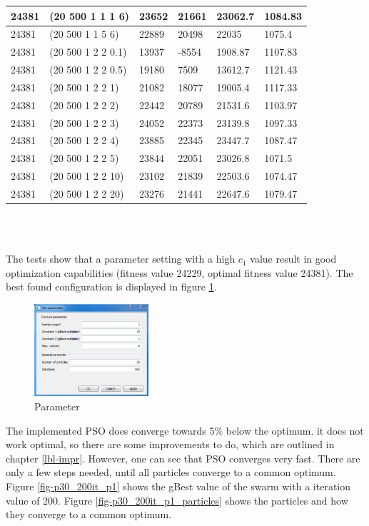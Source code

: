 \documentclass{article}
\begin{document}
\begin{tabular}{|l|l|l|l|l|l|}
	24381 & (20 500 1 1 1 6) & 23652 & 21661 & 23062.7 & 1084.83 \\ \hline
	24381 & (20 500 1 1 5 6) & 22889 & 20498 & 22035 & 1075.4 \\ \hline
	24381 & (20 500 1 2 2 0.1) & 13937 & -8554 & 1908.87 & 1107.83 \\ \hline
	24381 & (20 500 1 2 2 0.5) & 19180 & 7509 & 13612.7 & 1121.43 \\ \hline
	24381 & (20 500 1 2 2 1) & 21082 & 18077 & 19005.4 & 1117.33 \\ \hline
	24381 & (20 500 1 2 2 2) & 22442 & 20789 & 21531.6 & 1103.97 \\ \hline
	24381 & (20 500 1 2 2 3) & 24052 & 22373 & 23139.8 & 1097.33 \\ \hline
	24381 & (20 500 1 2 2 4) & 23885 & 22345 & 23447.7 & 1087.47 \\ \hline
	24381 & (20 500 1 2 2 5) & 23844 & 22051 & 23026.8 & 1071.5 \\ \hline
	24381 & (20 500 1 2 2 10) & 23102 & 21839 & 22503.6 & 1074.47 \\ \hline
	24381 & (20 500 1 2 2 20) & 23276 & 21441 & 22647.6 & 1079.47 \\ \hline
\end{tabular} \\\\

\newpage

The tests show that a parameter setting with a high $c_1$ value result in good optimization capabilities (fitness value 24229, optimal fitness value 24381). The best found configuration is displayed in figure \ref{fig-param}.

\begin{figure}[H]
    \centering
    \includegraphics[width=160px]{images/parameter.PNG}
    \caption{Parameter}
    \label{fig-param}
\end{figure}

The implemented PSO does converge towards 5\% below the optimum. it does not work optimal, so there are some improvements to do, which are outlined in chapter \ref{lbl-impr}. However, one can see that PSO converges very fast. There are only a few steps needed, until all particles converge to a common optimum. Figure \ref{fig-p30_200it_p1} shows the gBest value of the swarm with a iteration value of 200. Figure \ref{fig-p30_200it_p1_particles} shows the particles and how they converge to a common optimum.
\end{document}
